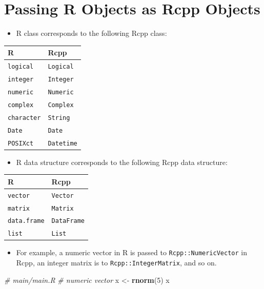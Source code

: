 \documentclass[]{book}
\newenvironment{Shaded}{\begin{snugshade}}{\end{snugshade}}
\newcommand{\KeywordTok}[1]{\textcolor[rgb]{0.13,0.29,0.53}{\textbf{#1}}}
\newcommand{\DecValTok}[1]{\textcolor[rgb]{0.00,0.00,0.81}{#1}}
\newcommand{\StringTok}[1]{\textcolor[rgb]{0.31,0.60,0.02}{#1}}
\newcommand{\CommentTok}[1]{\textcolor[rgb]{0.56,0.35,0.01}{\textit{#1}}}
\newcommand{\NormalTok}[1]{#1}
\providecommand{\tightlist}{%
  \setlength{\itemsep}{0pt}\setlength{\parskip}{0pt}}
\begin{document}
\section{Passing R Objects as Rcpp
Objects}\label{passing-r-objects-as-rcpp-objects}

\begin{itemize}
\tightlist
\item
  R class corresponds to the following Rcpp class:
\end{itemize}

\begin{longtable}[]{@{}ll@{}}
\toprule
R & Rcpp\tabularnewline
\midrule
\endhead
\texttt{logical} & \texttt{Logical}\tabularnewline
\texttt{integer} & \texttt{Integer}\tabularnewline
\texttt{numeric} & \texttt{Numeric}\tabularnewline
\texttt{complex} & \texttt{Complex}\tabularnewline
\texttt{character} & \texttt{String}\tabularnewline
\texttt{Date} & \texttt{Date}\tabularnewline
\texttt{POSIXct} & \texttt{Datetime}\tabularnewline
\bottomrule
\end{longtable}

\begin{itemize}
\tightlist
\item
  R data structure corresponds to the following Rcpp data structure:
\end{itemize}

\begin{longtable}[]{@{}ll@{}}
\toprule
R & Rcpp\tabularnewline
\midrule
\endhead
\texttt{vector} & \texttt{Vector}\tabularnewline
\texttt{matrix} & \texttt{Matrix}\tabularnewline
\texttt{data.frame} & \texttt{DataFrame}\tabularnewline
\texttt{list} & \texttt{List}\tabularnewline
\bottomrule
\end{longtable}

\begin{itemize}
\tightlist
\item
  For example, a numeric vector in R is passed to
  \texttt{Rcpp::NumericVector} in Rcpp, an integer matrix is to
  \texttt{Rcpp::IntegerMatrix}, and so on.
\end{itemize}

\begin{Shaded}
\begin{Highlighting}[]
\CommentTok{# main/main.R}
\CommentTok{# numeric vector }
\NormalTok{x <-}\StringTok{ }\KeywordTok{rnorm}\NormalTok{(}\DecValTok{5}\NormalTok{)}
\NormalTok{x}
\end{Highlighting}
\end{Shaded}
\end{document}
